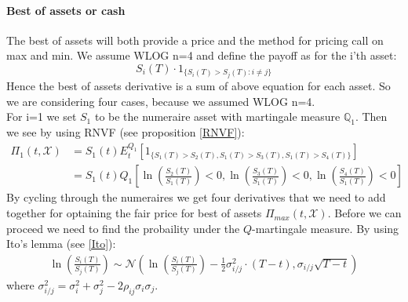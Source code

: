 \paragraph{Best of assets or cash}
The best of assets will both provide a price and the method for pricing call on max and min. We assume WLOG n=4 and define the payoff as for the i'th asset:
$$S_i(T) \cdot 1_{\{S_i(T)>S_j(T): i\neq j\}}$$
Hence the best of assets derivative is a sum of above equation for each asset. So we are considering four cases, because we assumed WLOG n=4. \\

For i=1 we set $S_1$ to be the numeraire asset with martingale measure $\mathbb{Q}_1$. Then we see by using RNVF (see proposition \ref{RNVF}):
\begin{equation}
\begin{split}
\Pi_1(t, \mathcal{X})&=S_1(t)E_t^{Q_1}[1_{\{S_1(T)>S_2(T), S_1(T)>S_3(T), S_1(T)>S_4(T)\}}]\\
&=S_1(t) Q_1[\ln(\frac{S_2(T)}{S_1(T)})<0, \ln(\frac{S_3(T)}{S_1(T)})<0, \ln(\frac{S_4(T)}{S_1(T)})<0]
\end{split}
\end{equation}
By cycling through the numeraires we get four derivatives that we need to add together for optaining the fair price for best of assets $\Pi_{max}(t,\mathcal{X})$. Before we can proceed we need to find the probaility under the $Q$-martingale measure. By using Ito's lemma (see \ref{Ito}):
\begin{align*}
\ln(\frac{S_i(T)}{S_j(T)})\sim \mathcal{N}(\ln(\frac{S_i(T)}{S_j(T)}) - \frac{1}{2}\sigma_{i/j}^2 \cdot (T-t), \sigma_{i/j}\sqrt{T-t})
\end{align*}
where $\sigma_{i/j}^2=\sigma_i^2+\sigma_j^2-2\rho_{ij}\sigma_i \sigma_j$.\\

